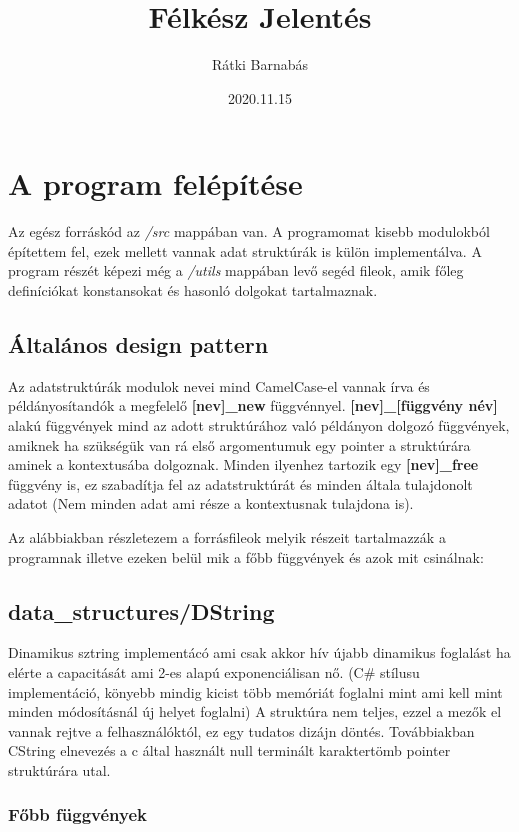 \documentclass{article}[12pt,a4paper]
\title{Félkész Jelentés}
\author{Rátki Barnabás}
\date{2020.11.15}
\newcommand{\lang}[1]{\textit{#1}}
\begin{document}
    \maketitle
    
    \section{A program felépítése}
    Az egész forráskód az \lang{/src} mappában van.
    A programomat kisebb modulokból építettem fel, ezek mellett vannak adat struktúrák is külön implementálva.
    A program részét képezi még a \lang{/utils} mappában levő segéd fileok, amik főleg definíciókat konstansokat és hasonló dolgokat tartalmaznak.

    \subsection{Általános design pattern}
    Az adatstruktúrák modulok nevei mind CamelCase-el vannak írva és példányosítandók a megfelelő \textbf{[nev]\_new} függvénnyel.
    \textbf{[nev]\_[függvény név]} alakú függvények mind az adott struktúrához való példányon dolgozó függvények, amiknek ha szükségük van rá első argomentumuk egy pointer a struktúrára aminek a kontextusába dolgoznak.
    Minden ilyenhez tartozik egy \textbf{[nev]\_free} függvény is, ez szabadítja fel az adatstruktúrát és minden általa tulajdonolt adatot (Nem minden adat ami része a kontextusnak tulajdona is).

    Az alábbiakban részletezem a forrásfileok melyik részeit tartalmazzák a programnak illetve ezeken belül mik a főbb függvények és azok mit csinálnak:
    
    \subsection{data\_structures/DString}
    Dinamikus sztring implementácó ami csak akkor hív újabb dinamikus foglalást ha elérte a capacitását ami 2-es alapú exponenciálisan nő. (C\# stílusu implementáció, könyebb mindig kicist több memóriát foglalni mint ami kell mint minden módosításnál új helyet foglalni)
    A struktúra nem teljes, ezzel a mezők el vannak rejtve a felhasználóktól, ez egy tudatos dizájn döntés.
    Továbbiakban CString elnevezés a c által használt null terminált karaktertömb pointer struktúrára utal.

    \subsubsection{Főbb függvények}
\end{document}

